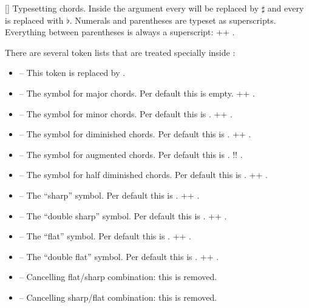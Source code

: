 \documentclass[load-preamble+]{cnltx-doc}
\begin{document}
\begin{commands}
  []
    Typesetting chords.  Inside the argument every \code{\#} will be replaced
    by $\sharp$ and every  is replaced with $\flat$.  Numerals and
    parentheses are typeset as superscripts.  Everything between parentheses
    is always a superscript: \verbcode++
    .
\end{commands}

There are several token lists that are treated specially inside :
\begin{itemize}
  \item \code{\^{}} -- This token is replaced by .
  \item {} -- The symbol for major chords.  Per default this is
    empty. \verbcode++ .
  \item {} -- The symbol for minor chords.  Per default this is
    .  \verbcode++ .
  \item {} -- The symbol for diminished chords.  Per default this is
    .  \verbcode++
    .
  \item \code{+} -- The symbol for augmented chords.  Per default this is
    .  \verbcode!!
    .
  \item {} -- The symbol for half diminished chords.  Per default
    this is .
    \verbcode++ .
  \item \code{\#} -- The \enquote{sharp} symbol.  Per default this is
    .  \verbcode++ .
  \item \code{\#\#} -- The \enquote{double sharp} symbol.  Per default this is
    .  \verbcode++ .
  \item {} -- The \enquote{flat} symbol.  Per default this is
    .  \verbcode++ .
  \item {} -- The \enquote{double flat} symbol.  Per default this is
    .  \verbcode++ .
  \item {} -- Cancelling flat/sharp combination: this is removed.
  \item {} -- Cancelling sharp/flat combination: this is removed.

\end{itemize}
\end{document}
